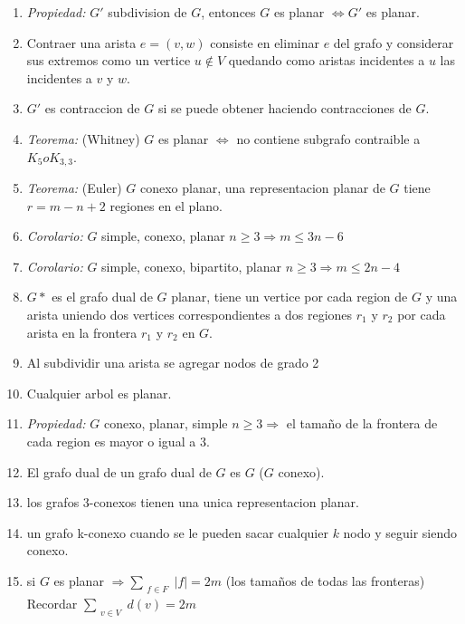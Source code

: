 \begin{enumerate}
\item \textit{Propiedad:} $G'$ subdivision de $G$, entonces $G$ es planar $\iff G'$ es planar.
\item Contraer una arista $e=(v,w)$ consiste en eliminar $e$ del grafo y considerar sus extremos como un vertice $u \notin V$ quedando como aristas incidentes a $u$ las incidentes a $v$ y $w$.
\item $G'$ es contraccion de $G$ si se puede obtener haciendo contracciones de $G$.
\item \textit{Teorema:} (Whitney) $G$ es planar $\iff$ no contiene subgrafo contraible a $K_{5} o K_{3,3}$.
\item \textit{Teorema:} (Euler) $G$ conexo planar, una representacion planar de $G$ tiene $r=m-n+2$ regiones en el plano.
\item \textit{Corolario:} $G$ simple, conexo, planar $n \geq 3 \Rightarrow m \leq 3n-6$
\item \textit{Corolario:} $G$ simple, conexo, bipartito, planar $n \geq 3 \Rightarrow m \leq 2n-4$
\item $G*$ es el grafo dual de $G$ planar, tiene un vertice por cada region de $G$ y una arista uniendo dos vertices correspondientes a dos regiones $r_{1}$ y $r_{2}$ por cada arista en la frontera $r_{1}$ y $r_{2}$ en $G$.
\item Al subdividir una arista se agregar nodos de grado 2
\item Cualquier arbol es planar.
\item \textit{Propiedad:} $G$ conexo, planar, simple $n \geq 3 \Rightarrow$ el tamaño de la frontera de cada region es mayor o igual a $3$.
\item El grafo dual de un grafo dual de $G$ es $G$ ($G$ conexo).
\item los grafos 3-conexos tienen una unica representacion planar.
\item un grafo k-conexo cuando se le pueden sacar cualquier $k$ nodo y seguir siendo conexo.
\item si $G$ es planar $\Rightarrow \sum_{\substack{f \in F}}|f| = 2m$ (los tamaños de todas las fronteras) Recordar $\sum_{\substack{v \in V}}d(v) = 2m$
\end{enumerate}
